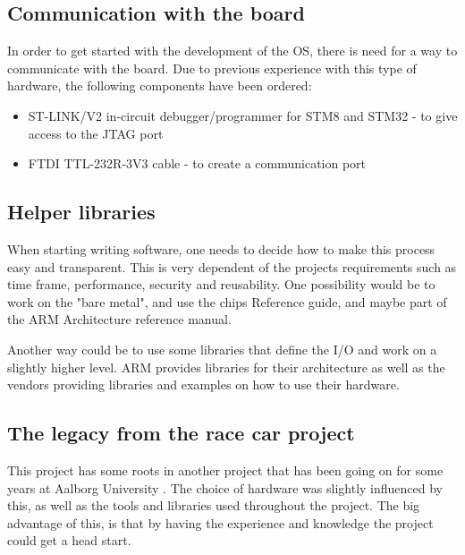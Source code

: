 \subsection{Communication with the board}
In order to get started with the development of the OS, there is need for
a way to communicate with the board. Due to previous experience with
this type of hardware, the following components have been ordered:

\begin{itemize}[noitemsep]
	\item ST-LINK/V2 in-circuit debugger/programmer for STM8 and STM32
	\cite{st_link} - to give access to the JTAG port
	\item FTDI TTL-232R-3V3 cable \cite{ttl_usb} - to create a communication
	port
\end{itemize}

\subsection{Helper libraries}
When starting writing software, one needs to decide how to make this
process easy and transparent. This is very dependent of the 
project\textquotesingle s requirements such as time frame, performance, 
security and reusability. One possibility would be to work on the 
"bare metal", and 
use the chip\textquotesingle s Reference guide, and maybe part of the 
ARM Architecture reference manual.

Another way could be to use some libraries that define the I/O and work
on a slightly higher level. ARM provides libraries for their architecture
as well as the vendors providing libraries and examples on how to use their
hardware. 

\subsection{The legacy from the race car project}
This project has some roots in another project that has been going on
for some years at Aalborg University \cite{aauracing}. 
The choice of hardware was
slightly influenced by this, as well as the tools and libraries used 
throughout the project. The big advantage of this, is that by having the 
experience and knowledge the project could get a head start.

